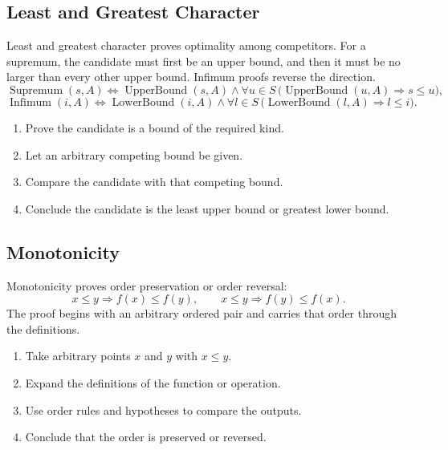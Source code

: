 \subsection*{Least and Greatest Character}
\label{subsec:property-least-greatest-character}

Least and greatest character proves optimality among competitors. For a
supremum, the candidate must first be an upper bound, and then it must be no
larger than every other upper bound. Infimum proofs reverse the direction.
\[
  \operatorname{Supremum}(s,A)
  \Longleftrightarrow
  \operatorname{UpperBound}(s,A)
  \land
  \forall u\in S\,
  \bigl(\operatorname{UpperBound}(u,A)\Rightarrow s\leq u\bigr),
\]
\[
  \operatorname{Infimum}(i,A)
  \Longleftrightarrow
  \operatorname{LowerBound}(i,A)
  \land
  \forall l\in S\,
  \bigl(\operatorname{LowerBound}(l,A)\Rightarrow l\leq i\bigr).
\]

\begin{remark}
\begin{enumerate}
  \item Prove the candidate is a bound of the required kind.
  \item Let an arbitrary competing bound be given.
  \item Compare the candidate with that competing bound.
  \item Conclude the candidate is the least upper bound or greatest lower
        bound.
\end{enumerate}
\end{remark}

\subsection*{Monotonicity}
\label{subsec:property-monotonicity}

Monotonicity proves order preservation or order reversal:
\[
  x\leq y \Rightarrow f(x)\leq f(y),
  \qquad
  x\leq y \Rightarrow f(y)\leq f(x).
\]
The proof begins with an arbitrary ordered pair and carries that order through
the definitions.

\begin{remark}
\begin{enumerate}
  \item Take arbitrary points $x$ and $y$ with $x\leq y$.
  \item Expand the definitions of the function or operation.
  \item Use order rules and hypotheses to compare the outputs.
  \item Conclude that the order is preserved or reversed.
\end{enumerate}
\end{remark}

